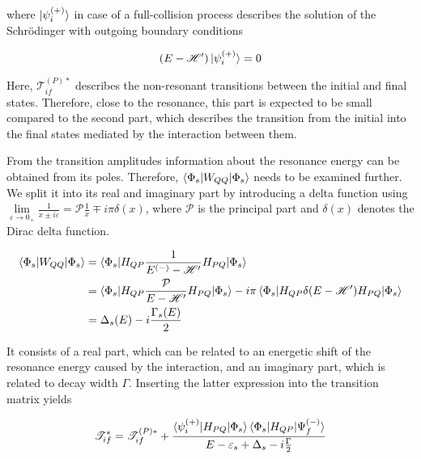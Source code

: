 where $\ket{\psi_i^{(+)}}$ in case of a full-collision process describes
the solution of the Schrödinger with outgoing
boundary conditions

\begin{equation}                                                              
  (E - \mathscr{H}') \ket{\psi_i^{(+)}} = 0
\end{equation}

Here, $\mathscr{T}_{if}^{(P)*}$ describes the non-resonant transitions
between the initial and final states. Therefore, close to   
the resonance, this part is expected to be small compared to the second part, which
describes the transition
from the initial into the final states mediated by the interaction between them.

From the transition amplitudes information about
the resonance energy can be obtained from its poles. Therefore,
$\braket{\Phi_s|W_{QQ}|\Phi_s}$ needs to be examined further.
We split it into
its real and imaginary part by introducing a delta function using 
$\lim\limits_{\varepsilon \to 0_+} \frac{1}{x \pm i\varepsilon}
 = \mathscr{P} \frac 1x \mp i\pi\delta(x)$,
where $\mathscr{P}$ is the principal part and $\delta(x)$ denotes the
Dirac delta function. \cite{Cohen-Tannoudji_3_2}

\begin{align}
  \braket{\Phi_s|W_{QQ}|\Phi_s} %
                                & = \braket{\Phi_s|H_{QP}
                                    \frac{1}{E^{(-)} - \mathscr{H}'}H_{PQ}|\Phi_s}\\
                                & = \braket{\Phi_s|H_{QP}
                                    \frac{\mathcal{P}}{E - \mathscr{H}'}H_{PQ}|\Phi_s}
                                    - i\pi \braket{\Phi_s|H_{QP}\delta(E-\mathscr{H}')H_{PQ}
                                    |\Phi_s} \\
                                & = \Delta_s(E) - i \frac{\Gamma_s(E)}{2}
\end{align}

It consists of a real part, which can be related to an energetic shift
of the resonance energy caused by the interaction, and an imaginary part,
which is related to decay width $\Gamma$.
Inserting the latter expression into the transition matrix yields

\begin{equation}
  \mathscr{T}_{if}^* = \mathscr{T}_{if}^{(P)*} + 
                     \frac{\braket{\psi_i^{(+)}|H_{PQ}|\Phi_s}
                           \braket{\Phi_s|H_{QP}|\Psi_f^{(-)}}}
                          {E-\varepsilon_s + \Delta_s - i \frac{\Gamma}{2}}
\end{equation}

